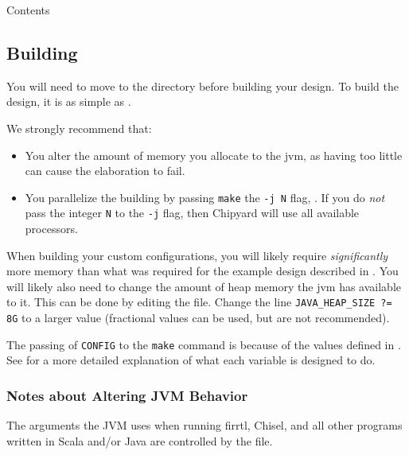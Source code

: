 \begin{listing}[h!tbp]
\caption{ Contents}
\label{lst:Custom_Config-NewTestConfig}
\end{listing}

\subsection{Building}\label{sec:Custom_Config-Building}
You will need to move to the  directory before building your design.
To build the design, it is as simple as .

We strongly recommend that:
\begin{itemize}
\item You alter the amount of memory you allocate to the \Gls{jvm}, as having too little can cause the \gls{elaboration} to fail.
\item You parallelize the building by passing \texttt{make} the \texttt{-j N} flag, .
  If you do \emph{not} pass the integer \texttt{N} to the \texttt{-j} flag, then Chipyard will use all available processors.
\end{itemize}

\begin{blackbox}
  When building your custom configurations, you will likely require \emph{significantly} more memory than what was required for the example design described in .
  You will likely also need to change the amount of heap memory the \gls{jvm} has available to it.
  This can be done by editing the  file.
  Change the line \texttt{JAVA_HEAP_SIZE ?= 8G} to a larger value (fractional values can be used, but are not recommended).
\end{blackbox}

The passing of \texttt{CONFIG} to the \texttt{make} command is because of the values defined in .
See  for a more detailed explanation of what each variable is designed to do.

\subsubsection{Notes about Altering JVM Behavior}\label{sec:Notes_Altering_JVM_Behavior}
The arguments the JVM uses when running \gls{firrtl}, Chisel, and all other programs written in Scala and/or Java are controlled by the  file.

